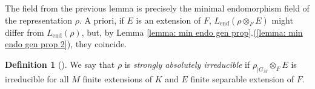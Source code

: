 \documentclass[a4paper,10pt]{amsart}
\theoremstyle{plain}
\newtheorem{lemma}[theorem]{Lemma}
\theoremstyle{definition}
\newtheorem{definition}[theorem]{Definition}
\theoremstyle{remark}
\newtheorem{remark}[theorem]{Remark}
\def\mr#1{\mathrm{#1}}
\DeclareMathOperator{\aut}{Aut}
\DeclareMathOperator{\Gal}{Gal}
\DeclareMathOperator{\End}{End}
\newcommand{\matteo}[1]{{\color{red}[Matteo: #1]}}
\begin{document}
The field from the previous lemma is precisely the minimal endomorphism field of the representation \(\rho\).
A priori, if \(E\) is an extension of \(F\), \(L_{\mr{end}}(\rho\otimes_F E)\) might differ from \(L_{\mr{end}}(\rho)\), but, by Lemma \ref{lemma: min endo gen prop}.(\ref{lemma: min endo gen prop 2}), they coincide.

\begin{definition}[{\cite[Section 1.4]{fitebbasta}}]
We say that \(\rho\) is \emph{strongly absolutely irreducible} if \(\rho_{|G_M} \otimes_F E\) is irreducible for all \(M\) finite extensions of \(K\) and \(E\) finite separable extension of \(F\).
\end{definition}
\end{document}
